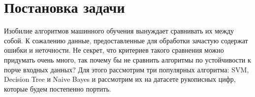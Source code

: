 \documentclass{article}
\begin{document}
\section{Постановка задачи}
Изобилие алгоритмов машинного обучения вынуждает сравнивать их между собой. К сожалению данные, предоставленные для обработки зачастую содержат ошибки и неточности. Не секрет, что критериев такого сравнения можно придумать очень много, так почему бы не сравнить алгоритмы по устойчивости к порче входных данных? Для этого рассмотрим три популярных алгоритма: SVM, Decision Tree и Naive Bayes и рассмотрим их на датасете рукописных цифр, которые будем постепенно портить.
\end{document}
